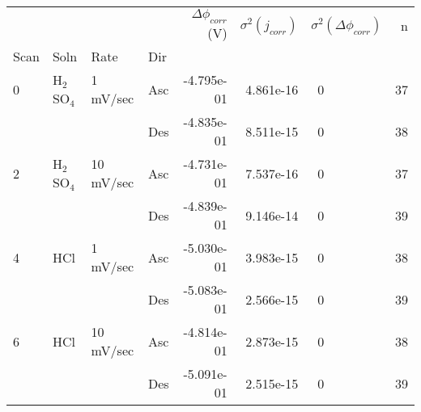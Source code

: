 \begin{tabular}{llllrrlr}
\toprule
  &     &           &     &  $\Delta \phi_{corr}$ (V) &  $\sigma^2(j_{corr})$ & $\sigma^2(\Delta \phi_{corr})$ &   n \\
Scan & Soln & Rate & Dir &                           &                       &                                &     \\
\midrule
0 & H$_2$SO$_4$ & 1 mV/sec & Asc &                -4.795e-01 &             4.861e-16 &                             ~0 &  37 \\
  &     &           & Des &                -4.835e-01 &             8.511e-15 &                             ~0 &  38 \\
2 & H$_2$SO$_4$ & 10 mV/sec & Asc &                -4.731e-01 &             7.537e-16 &                             ~0 &  37 \\
  &     &           & Des &                -4.839e-01 &             9.146e-14 &                             ~0 &  39 \\
4 & HCl & 1 mV/sec & Asc &                -5.030e-01 &             3.983e-15 &                             ~0 &  38 \\
  &     &           & Des &                -5.083e-01 &             2.566e-15 &                             ~0 &  39 \\
6 & HCl & 10 mV/sec & Asc &                -4.814e-01 &             2.873e-15 &                             ~0 &  38 \\
  &     &           & Des &                -5.091e-01 &             2.515e-15 &                             ~0 &  39 \\
\bottomrule
\end{tabular}
